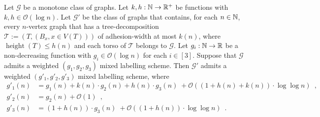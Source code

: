 \documentclass{patmorin}
\renewcommand{\le}{\leqslant}
\newcommand{\pat}[1]{\textcolor{Magenta}{PaMo: #1}}
\newcommand{\piotr}[1]{\textcolor{red}{PiMi: #1}}
\DeclareMathOperator{\height}{height}
\newcommand{\Oh}{\calO}
\newcommand{\calG}{\mathcal{G}}
\newcommand{\calO}{\mathcal{O}}
\newcommand{\calT}{\mathcal{T}}
\begin{document}
  \begin{lem}\label{small_height}
  Let $\calG$ be a monotone class of graphs. 
  Let $k,h:\mathbb{N}\to\mathbb{R}^+$ be functions with $k,h\in \Oh(\log n)$. 
  Let $\calG'$ be the class of graphs that contains, for each $n\in\mathbb{N}$, every $n$-vertex graph that has a tree-decomposition $\calT:=(T,(B_x,x\in V(T)))$ of adhesion-width at most $k(n)$, where $\height(T)\le h(n)$ and each torso of $\calT$ belongs to $\calG$.
     Let $g_i:\mathbb{N}\to\mathbb{R}$ be a non-decreasing function  with $g_i\in\Oh(\log n)$ for each $i\in[3]$.
     Suppose that $\calG$ admits a weighted $(g_1,g_2,g_3)$ mixed labelling scheme. 
     Then $\calG'$ admits a weighted $(g'_1,g'_2,g'_3)$ mixed labelling scheme, where
     \begin{align*}
       g'_1(n) & = g_1(n)
             + k(n)\cdot g_2(n)
            + h(n)\cdot g_3(n)  \; {} + \Oh((1+h(n)+k(n))\cdot\log\log n)\enspace,\\
       g'_2(n) & = g_2(n) + \Oh(1)\enspace, \\
       g'_3(n) & = (1+h(n))\cdot g_3(n)  \; {}   + \Oh((1+h(n))\cdot\log\log n)\enspace.
     \end{align*}
  \end{lem}
\end{document}
